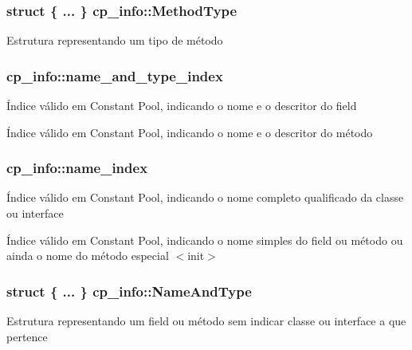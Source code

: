 \subsubsection[{\texorpdfstring{Method\+Type}{MethodType}}]{\setlength{\rightskip}{0pt plus 5cm}struct \{ ... \}   cp\+\_\+info\+::\+Method\+Type}\hypertarget{structcp__info_acc187adbe8e183174d18d0b17f94d21f}{}\label{structcp__info_acc187adbe8e183174d18d0b17f94d21f}
Estrutura representando um tipo de método 
\subsubsection[{\texorpdfstring{name\+\_\+and\+\_\+type\+\_\+index}{name_and_type_index}}]{ cp\+\_\+info\+::name\+\_\+and\+\_\+type\+\_\+index}\hypertarget{structcp__info_a1b947f3ff3eee58acf5500debf45848c}{}\label{structcp__info_a1b947f3ff3eee58acf5500debf45848c}
Índice válido em Constant Pool, indicando o nome e o descritor do field

Índice válido em Constant Pool, indicando o nome e o descritor do método 
\subsubsection[{\texorpdfstring{name\+\_\+index}{name_index}}]{ cp\+\_\+info\+::name\+\_\+index}\hypertarget{structcp__info_a0b2c4677d0d56defd858fdc796caec87}{}\label{structcp__info_a0b2c4677d0d56defd858fdc796caec87}
Índice válido em Constant Pool, indicando o nome completo qualificado da classe ou interface

Índice válido em Constant Pool, indicando o nome simples do field ou método ou ainda o nome do método especial $<$init$>$ 
\subsubsection[{\texorpdfstring{Name\+And\+Type}{NameAndType}}]{\setlength{\rightskip}{0pt plus 5cm}struct \{ ... \}   cp\+\_\+info\+::\+Name\+And\+Type}\hypertarget{structcp__info_ad893962eccc22c7d9a6532aa43448ffa}{}\label{structcp__info_ad893962eccc22c7d9a6532aa43448ffa}
Estrutura representando um field ou método sem indicar classe ou interface a que pertence 
